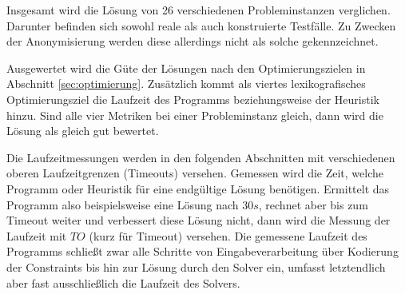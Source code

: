 Insgesamt wird die Lösung von 26 verschiedenen Probleminstanzen verglichen.
Darunter befinden sich sowohl reale als auch konstruierte Testfälle.
Zu Zwecken der Anonymisierung werden diese allerdings nicht als solche gekennzeichnet.

Ausgewertet wird die Güte der Lösungen nach den Optimierungszielen in Abschnitt \ref{sec:optimierung}.
Zusätzlich kommt als viertes lexikografisches Optimierungsziel die Laufzeit des Programms beziehungsweise der Heuristik hinzu.
Sind alle vier Metriken bei einer Probleminstanz gleich, dann wird die Lösung als gleich gut bewertet.

Die Laufzeitmessungen werden in den folgenden Abschnitten mit verschiedenen oberen Laufzeitgrenzen (Timeouts) versehen.
Gemessen wird die Zeit, welche Programm oder Heuristik für eine endgültige Lösung benötigen.
Ermittelt das Programm also beispielsweise eine Lösung nach $30s$, rechnet aber bis zum Timeout weiter und verbessert diese Lösung nicht,
dann wird die Messung der Laufzeit mit $TO$ (kurz für Timeout) versehen.
Die gemessene Laufzeit des Programms schließt zwar alle Schritte von Eingabeverarbeitung über Kodierung der Constraints bis hin zur Lösung durch den Solver ein,
umfasst letztendlich aber fast ausschließlich die Laufzeit des Solvers.

